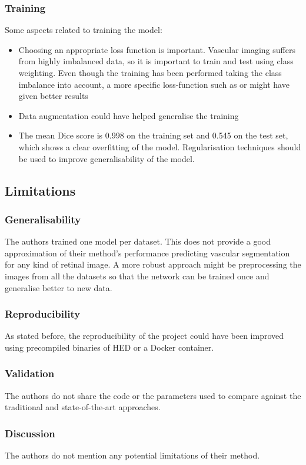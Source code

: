 \subsubsection{Training}
Some aspects related to training the model:
\begin{itemize}
  \item Choosing an appropriate loss function is important. Vascular imaging suffers from highly imbalanced data, so it is important to train and test using class weighting. Even though the training has been performed taking the class imbalance into account, a more specific loss-function such as \cite{sudre_generalised_2017} or \cite{fidon_generalised_2018} might have given better results
  \item Data augmentation could have helped generalise the training
  \item The mean Dice score is 0.998 on the training set and 0.545 on the test set, which shows a clear overfitting of the model. Regularisation techniques should be used to improve generalisability of the model.
\end{itemize}


\subsection{Limitations}

\subsubsection{Generalisability}
The authors trained one model per dataset. This does not provide a good approximation of their method's performance predicting vascular segmentation for any kind of retinal image. A more robust approach might be preprocessing the images from all the datasets so that the network can be trained once and generalise better to new data.

\subsubsection{Reproducibility}
As stated before, the reproducibility of the project could have been improved using precompiled binaries of HED or a Docker container.

\subsubsection{Validation}
The authors do not share the code or the parameters used to compare against the traditional and state-of-the-art approaches.

\subsubsection{Discussion}
The authors do not mention any potential limitations of their method.


